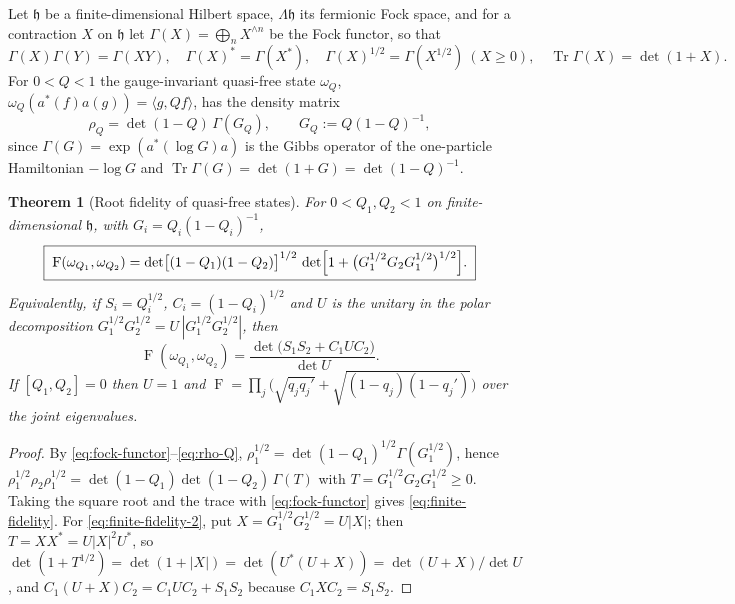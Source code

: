 \documentclass[11pt]{article}
\theoremstyle{accent}
\newtheorem{theorem}{Theorem}[section]
\theoremstyle{definition}
\newcommand{\Tr}{\operatorname{Tr}}
\newcommand{\Fid}{\operatorname{F}}
\begin{document}
Let \(\mathfrak h\) be a finite-dimensional Hilbert space, \(\Lambda\mathfrak h\) its fermionic Fock space, and for a contraction \(X\) on \(\mathfrak h\) let \(\Gamma(X)=\bigoplus_n X^{\wedge n}\) be the Fock functor, so that
\begin{equation}\label{eq:fock-functor}
 \Gamma(X)\Gamma(Y)=\Gamma(XY),\quad \Gamma(X)^*=\Gamma(X^*),\quad \Gamma(X)^{1/2}=\Gamma(X^{1/2})\ (X\ge0),\quad \Tr\Gamma(X)=\det(1+X).
\end{equation}
For \(0<Q<1\) the gauge-invariant quasi-free state \(\omega_Q\), \(\omega_Q(a^*(f)a(g))=\langle g,Qf\rangle\), has the density matrix
\begin{equation}\label{eq:rho-Q}
 \rho_Q=\det(1-Q)\,\Gamma(G_Q),\qquad G_Q:=Q(1-Q)^{-1},
\end{equation}
since \(\Gamma(G)=\exp(a^*(\log G)a)\) is the Gibbs operator of the one-particle Hamiltonian \(-\log G\) and \(\Tr\Gamma(G)=\det(1+G)=\det(1-Q)^{-1}\).

\begin{theorem}[Root fidelity of quasi-free states]\label{thm:finite-fidelity}
For \(0<Q_1,Q_2<1\) on finite-dimensional \(\mathfrak h\), with \(G_i=Q_i(1-Q_i)^{-1}\),
\begin{equation}\label{eq:finite-fidelity}
 \boxed{\;
 \Fid(\omega_{Q_1},\omega_{Q_2})
 =\det\bigl[(1-Q_1)(1-Q_2)\bigr]^{1/2}\,
  \det\Bigl[1+\bigl(G_1^{1/2}G_2G_1^{1/2}\bigr)^{1/2}\Bigr].\;}
\end{equation}
Equivalently, if \(S_i=Q_i^{1/2}\), \(C_i=(1-Q_i)^{1/2}\) and \(U\) is the unitary in the polar decomposition \(G_1^{1/2}G_2^{1/2}=U\,|G_1^{1/2}G_2^{1/2}|\), then
\begin{equation}\label{eq:finite-fidelity-2}
 \Fid(\omega_{Q_1},\omega_{Q_2})=\frac{\det\bigl(S_1S_2+C_1UC_2\bigr)}{\det U}.
\end{equation}
If \([Q_1,Q_2]=0\) then \(U=1\) and \(\Fid=\prod_j\bigl(\sqrt{q_jq_j'}+\sqrt{(1-q_j)(1-q_j')}\bigr)\) over the joint eigenvalues.
\end{theorem}

\begin{proof}
By \eqref{eq:fock-functor}--\eqref{eq:rho-Q}, \(\rho_1^{1/2}=\det(1-Q_1)^{1/2}\Gamma(G_1^{1/2})\), hence
\(\rho_1^{1/2}\rho_2\rho_1^{1/2}=\det(1-Q_1)\det(1-Q_2)\,\Gamma(T)\) with \(T=G_1^{1/2}G_2G_1^{1/2}\ge0\).  Taking the square root and the trace with \eqref{eq:fock-functor} gives \eqref{eq:finite-fidelity}.  For \eqref{eq:finite-fidelity-2}, put \(X=G_1^{1/2}G_2^{1/2}=U|X|\); then \(T=XX^*=U|X|^2U^*\), so \(\det(1+T^{1/2})=\det(1+|X|)=\det(U^*(U+X))=\det(U+X)/\det U\), and \(C_1(U+X)C_2=C_1UC_2+S_1S_2\) because \(C_1XC_2=S_1S_2\).
\end{proof}
\end{document}
